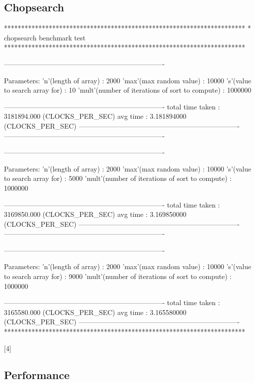 \documentclass[a4paper]{article}
\begin{document}
\subsection{Chopsearch}
\begin{verbatimtab}[4]
**********************************************************************
* chopsearch benchmark test
**********************************************************************

----------------------------------------------------------------------

	Parameters:
		'n'(length of array) 				:	2000
		'max'(max random value) 			:	10000
		's'(value to search array for) 			:	10
		'mult'(number of iterations of sort to compute) :	1000000


----------------------------------------------------------------------
total time taken 	: 3181894.000 (CLOCKS_PER_SEC)
avg time 		: 3.181894000 (CLOCKS_PER_SEC)
----------------------------------------------------------------------
----------------------------------------------------------------------

----------------------------------------------------------------------

	Parameters:
		'n'(length of array) 				:	2000
		'max'(max random value) 			:	10000
		's'(value to search array for) 			:	5000
		'mult'(number of iterations of sort to compute) :	1000000


----------------------------------------------------------------------
total time taken 	: 3169850.000 (CLOCKS_PER_SEC)
avg time 		: 3.169850000 (CLOCKS_PER_SEC)
----------------------------------------------------------------------
----------------------------------------------------------------------

----------------------------------------------------------------------

	Parameters:
		'n'(length of array) 				:	2000
		'max'(max random value) 			:	10000
		's'(value to search array for) 			:	9000
		'mult'(number of iterations of sort to compute) :	1000000


----------------------------------------------------------------------
total time taken 	: 3165580.000 (CLOCKS_PER_SEC)
avg time 		: 3.165580000 (CLOCKS_PER_SEC)
----------------------------------------------------------------------
**********************************************************************
\end{verbatimtab}[4]
\subsection{Performance}
\end{document}
